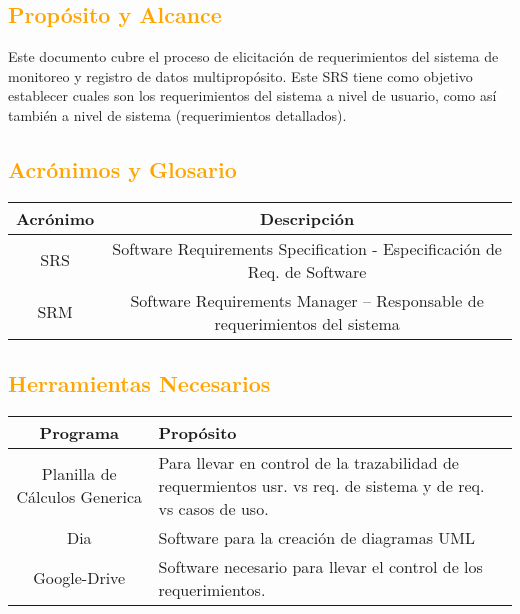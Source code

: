 \subsection{\textcolor{orange}{Propósito y Alcance}}
Este documento cubre el proceso de elicitación de requerimientos del sistema
de monitoreo y registro de datos multipropósito. Este SRS tiene como objetivo
establecer cuales son los requerimientos del sistema a nivel de usuario, como
así también a nivel de sistema (requerimientos detallados). 

\subsection{\textcolor{orange}{Acrónimos y Glosario}}
\begin{table}[!h]
\begin{center}
\begin{tabular}{|c|c|}
\hline
\rowcolor[RGB]{255,127,0} Acrónimo & Descripción \\
\hline
SRS & Software Requirements Specification - Especificación de Req. de Software \\
\hline
SRM & Software Requirements  Manager – Responsable de requerimientos del sistema\\
\hline
\end{tabular}
\end{center}
\end{table}

\subsection{\textcolor{orange}{Herramientas Necesarios}}
\begin{table}[!h]
\begin{center}
\begin{tabular}{|c|p{100mm}|}
\hline
\rowcolor[RGB]{255,127,0} Programa & Propósito \\
\hline
Planilla de Cálculos Generica & Para llevar en control de la trazabilidad
de requermientos usr. vs req. de sistema y de req. vs casos de uso.\\
\hline
Dia & Software para la creación de diagramas UML\\
\hline
Google-Drive & Software necesario para llevar el control de los requerimientos.\\
\hline
\end{tabular}
\end{center}
\end{table}

